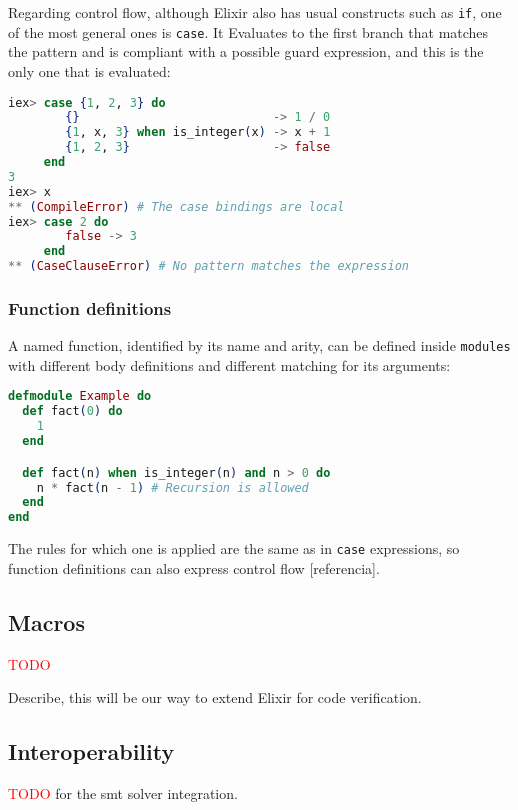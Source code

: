 Regarding control flow, although Elixir also has usual constructs such as 
\verb|if|, one of the most general ones is \verb|case|. It Evaluates to 
the first branch that matches the pattern and is compliant with a possible
guard expression, and this is the only one that is evaluated:

\begin{lstlisting}[language=elixir,numbers=none,frame=none]
iex> case {1, 2, 3} do 
        {}                           -> 1 / 0
        {1, x, 3} when is_integer(x) -> x + 1
        {1, 2, 3}                    -> false
     end
3
iex> x
** (CompileError) # The case bindings are local
iex> case 2 do 
        false -> 3 
     end 
** (CaseClauseError) # No pattern matches the expression
\end{lstlisting}

\subsubsection{Function definitions}

A named function, identified by its name and arity, can be defined inside 
\verb|modules| with different body definitions and different matching for
its arguments:

\begin{lstlisting}[language=elixir,numbers=none,frame=none]
defmodule Example do 
  def fact(0) do 
    1
  end

  def fact(n) when is_integer(n) and n > 0 do 
    n * fact(n - 1) # Recursion is allowed
  end
end
\end{lstlisting}

The rules for which one is applied are the same as in \verb|case| expressions,
so function definitions can also express control flow [referencia].

\subsection{Macros}

\textcolor{red}{TODO}

Describe, this will be our way to extend Elixir for code verification.

\subsection{Interoperability}

\textcolor{red}{TODO} for the \acrshort{smt} solver integration.

